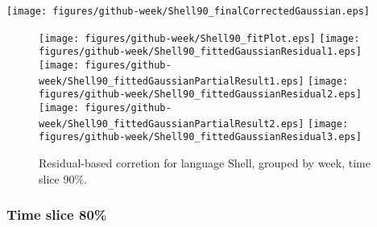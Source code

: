 \begin{center}
{\texttt{[image: figures/github-week/Shell90\_finalCorrectedGaussian.eps]}}
\end{center}

\FloatBarrier

\begin{figure}[t]
\centering
{}
{\texttt{[image: figures/github-week/Shell90\_fitPlot.eps]}}
{\texttt{[image: figures/github-week/Shell90\_fittedGaussianResidual1.eps]}}
{\texttt{[image: figures/github-week/Shell90\_fittedGaussianPartialResult1.eps]}}
{\texttt{[image: figures/github-week/Shell90\_fittedGaussianResidual2.eps]}}
{\texttt{[image: figures/github-week/Shell90\_fittedGaussianPartialResult2.eps]}}
{\texttt{[image: figures/github-week/Shell90\_fittedGaussianResidual3.eps]}}
\caption{Residual-based corretion for language Shell, grouped by week, time slice 90\%.}
\end{figure}


\FloatBarrier


\subsubsection{Time slice 80\%}


